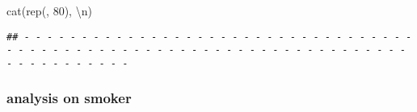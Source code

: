 \documentclass[
]{article}
\newenvironment{Shaded}{\begin{snugshade}}{\end{snugshade}}
\newcommand{\DecValTok}[1]{\textcolor[rgb]{0.00,0.00,0.81}{#1}}
\newcommand{\FunctionTok}[1]{\textcolor[rgb]{0.00,0.00,0.00}{#1}}
\newcommand{\NormalTok}[1]{#1}
\newcommand{\SpecialCharTok}[1]{\textcolor[rgb]{0.00,0.00,0.00}{#1}}
\newcommand{\StringTok}[1]{\textcolor[rgb]{0.31,0.60,0.02}{#1}}
\begin{document}
\begin{Shaded}
\begin{Highlighting}[]
\FunctionTok{cat}\NormalTok{(}\FunctionTok{rep}\NormalTok{(}\StringTok{\textquotesingle{}{-}\textquotesingle{}}\NormalTok{, }\DecValTok{80}\NormalTok{), }\StringTok{\textquotesingle{}}\SpecialCharTok{\textbackslash{}n}\StringTok{\textquotesingle{}}\NormalTok{)}
\end{Highlighting}
\end{Shaded}

\begin{verbatim}
## - - - - - - - - - - - - - - - - - - - - - - - - - - - - - - - - - - - - - - - - - - - - - - - - - - - - - - - - - - - - - - - - - - - - - - - - - - - - - - - -
\end{verbatim}

\hypertarget{analysis-on-smoker}{%
\subsubsection{analysis on smoker}\label{analysis-on-smoker}}
\end{document}
